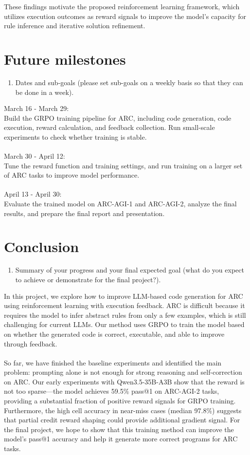 \documentclass[11pt,letterpaper]{article}
\begin{document}
These findings motivate the proposed reinforcement learning framework, which utilizes execution outcomes as reward signals to improve the model's capacity for rule inference and iterative solution refinement.



\section{Future milestones}
{\color{red}
\begin{enumerate}
    \item Dates and sub-goals (please set sub-goals on a weekly basis so that they can be done in a week).
\end{enumerate}
}
March 16 - March 29:\\
Build the GRPO training pipeline for ARC, including code generation, code execution, reward calculation, and feedback collection. Run small-scale experiments to check whether training is stable.
\\\\
March 30 - April 12:\\
Tune the reward function and training settings, and run training on a larger set of ARC tasks to improve model performance.
\\\\
April 13 - April 30:\\
Evaluate the trained model on ARC-AGI-1 and ARC-AGI-2, analyze the final results, and prepare the final report and presentation.
\section{Conclusion}
{\color{red}
\begin{enumerate}
    \item Summary of your progress and your final expected goal (what do you expect to achieve or demonstrate for the final project?).
\end{enumerate}
}
In this project, we explore how to improve LLM-based code generation for ARC using reinforcement learning with execution feedback. ARC is difficult because it requires the model to infer abstract rules from only a few examples, which is still challenging for current LLMs. Our method uses GRPO to train the model based on whether the generated code is correct, executable, and able to improve through feedback.
\\ \\
So far, we have finished the baseline experiments and identified the main problem: prompting alone is not enough for strong reasoning and self-correction on ARC. Our early experiments with Qwen3.5-35B-A3B show that the reward is not too sparse---the model achieves 59.5\% pass@1 on ARC-AGI-2 tasks, providing a substantial fraction of positive reward signals for GRPO training. Furthermore, the high cell accuracy in near-miss cases (median 97.8\%) suggests that partial credit reward shaping could provide additional gradient signal. For the final project, we hope to show that this training method can improve the model’s pass@1 accuracy and help it generate more correct programs for ARC tasks.
\end{document}
